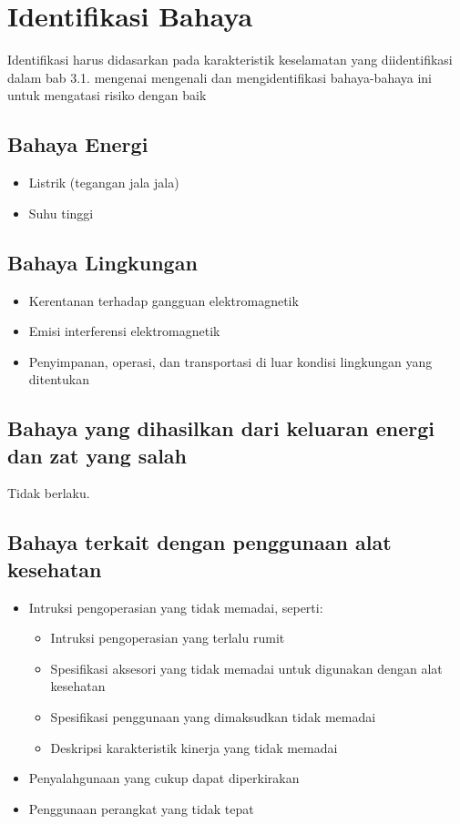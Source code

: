 \documentclass[11pt,a4paper,twoside,draft,onecolumn]{book}
\begin{document}
		\section{Identifikasi Bahaya}
		Identifikasi harus didasarkan pada karakteristik keselamatan yang diidentifikasi dalam bab 3.1. mengenai mengenali dan mengidentifikasi bahaya-bahaya ini untuk mengatasi risiko dengan baik 
		
			\subsection{Bahaya Energi}
			\begin{itemize}
				\item Listrik (tegangan jala jala)
				\item Suhu tinggi
			\end{itemize}
			
			\subsection{Bahaya Lingkungan}
			\begin{itemize}
				\item Kerentanan terhadap gangguan elektromagnetik
				\item Emisi interferensi elektromagnetik
				\item Penyimpanan, operasi, dan transportasi di luar kondisi lingkungan yang ditentukan
			\end{itemize}
			
			\subsection{Bahaya yang dihasilkan dari keluaran energi dan zat yang salah}
			Tidak berlaku.
			
			\subsection{Bahaya terkait dengan penggunaan alat kesehatan}
			\begin{itemize}
				\item Intruksi pengoperasian yang tidak memadai, seperti:
				\begin{itemize}
					\item Intruksi pengoperasian yang terlalu rumit
					\item Spesifikasi aksesori yang tidak memadai untuk digunakan dengan alat kesehatan 
					\item Spesifikasi penggunaan yang dimaksudkan tidak memadai
					\item Deskripsi karakteristik kinerja yang tidak memadai
				\end{itemize}
				\item Penyalahgunaan yang cukup dapat diperkirakan
				\item Penggunaan perangkat yang tidak tepat
			\end{itemize}
			
\end{document}

